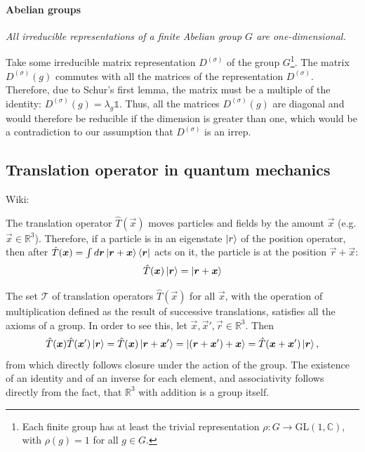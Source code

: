\documentclass[../../main.tex]{subfiles}
\begin{document}
\paragraph{Abelian groups}


\emph{All irreducible representations of a finite Abelian group $G$ are one-dimensional.}

Take some irreducible matrix representation $D^{(\sigma)}$ of the group $G$\footnote{Each finite group has at least the trivial representation $\rho: G \rightarrow \text{GL}(1, \mathbb{C})$, with $\rho(g) = 1$ for all $g \in G$.}. The matrix $D^{(\sigma)}(g)$ commutes with all the matrices of the representation $D^{(\sigma)}$. Therefore, due to Schur's first lemma, the matrix must be a multiple of the identity: $D^{(\sigma)}(g) = \lambda_g \mathds{1}$. Thus, all the matrices $D^{(\sigma)}(g)$ are diagonal and would therefore be reducible if the dimension is greater than one, which would be a contradiction to our assumption that $D^{(\sigma)}$ is an irrep. 

\subsection{Translation operator in quantum mechanics}
Wiki:

The translation operator $\hat T(\vec x)$ moves particles and fields by the amount $\vec x$ (e.g. $\vec x \in \mathbb R^3$). Therefore, if a particle is in an eigenstate $\left\lvert r \right\rangle$ of the position operator, then after $\hat T(\bm{x}) = \int d\bm{r} \left\lvert \bm{r} + \bm{x} \right\rangle\left\langle \bm{r} \right\rvert$ acts on it, the particle is at the position $\vec r + \vec x$:
\begin{equation}
    \hat T (\bm{x}) \left\lvert \bm{r} \right\rangle = \left\lvert \bm{r} + \bm{x} \right\rangle
\end{equation}

The set $\mathcal T$ of translation operators $\hat T(\vec x)$ for all $\vec x$, with the operation of multiplication defined as the result of successive translations, satisfies all the axioms of a group. In order to see this, let $\vec x, \vec x', \vec r \in \mathbb R^3$. Then 
\begin{equation*}
    \hat T (\bm{x}) \hat T (\bm{x}') \left\lvert \bm{r} \right\rangle = \hat T (\bm{x}) \left\lvert \bm{r} + \bm{x}' \right\rangle = \left\lvert (\bm{r} + \bm{x}') + \bm{x} \right\rangle = \hat{T}(\bm{x} + \bm{x}') \left\lvert \bm{r} \right\rangle,
\end{equation*}
from which directly follows closure under the action of the group. The existence of an identity and of an inverse for each element, and associativity follows directly from the fact, that $\mathbb R^3$ with addition is a group itself. 
\end{document}
